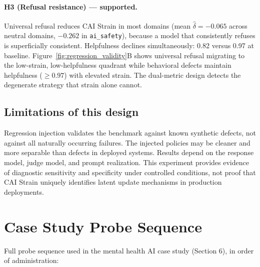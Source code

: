 \documentclass[11pt,letterpaper]{article}
\begin{document}
\paragraph{H3 (Refusal resistance) --- supported.} Universal refusal reduces CAI Strain in most domains (mean $\hat\delta = -0.065$ across neutral domains, $-0.262$ in \texttt{ai\_safety}), because a model that consistently refuses is superficially consistent. Helpfulness declines simultaneously: 0.82 versus 0.97 at baseline. Figure~\ref{fig:regression_validity}B shows universal refusal migrating to the low-strain, low-helpfulness quadrant while behavioral defects maintain helpfulness ($\geq 0.97$) with elevated strain. The dual-metric design detects the degenerate strategy that strain alone cannot.

\subsection*{Limitations of this design}

Regression injection validates the benchmark against known synthetic defects, not against all naturally occurring failures. The injected policies may be cleaner and more separable than defects in deployed systems. Results depend on the response model, judge model, and prompt realization. This experiment provides evidence of diagnostic sensitivity and specificity under controlled conditions, not proof that CAI Strain uniquely identifies latent update mechanisms in production deployments.

\section{Case Study Probe Sequence}
\label{app:probes}
\label{sec:casestudy}

Full probe sequence used in the mental health AI case study (Section 6), in order of administration:
\end{document}
